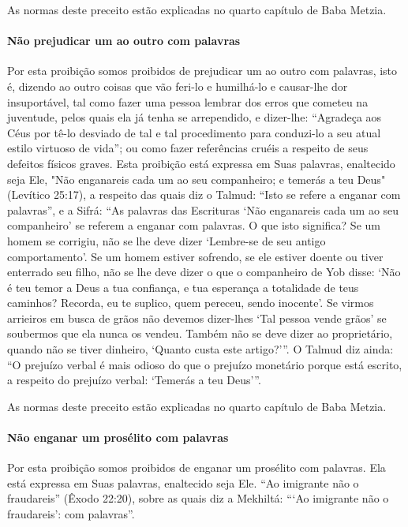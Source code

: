As normas deste preceito estão explicadas no quarto capítulo de Baba Metzia.

\paragraph{Não prejudicar um ao outro com palavras}

Por esta proibição somos proibidos de prejudicar um ao outro com
palavras, isto é, dizendo ao outro coisas que vão feri-lo e humilhá-lo e
causar-lhe dor insuportável, tal como fazer uma pessoa lembrar dos erros
que cometeu na juventude, pelos quais ela já tenha se arrependido, e
dizer-lhe: ``Agradeça aos Céus por tê-lo desviado de tal e tal
procedimento para conduzi-lo a seu atual estilo virtuoso de vida''; ou
como fazer referências cruéis a respeito de seus defeitos físicos
graves. Esta proibição está expressa em Suas palavras, enaltecido seja
Ele, "Não enganareis cada um ao seu companheiro; e temerás a teu Deus"
(Levítico 25:17), a respeito das quais diz o Talmud: ``Isto se refere a
enganar com palavras'', e a Sifrá: ``As palavras das Escrituras `Não
enganareis cada um ao seu companheiro' se referem a enganar com
palavras. O que isto significa? Se um homem se corrigiu, não se lhe
deve dizer `Lembre-se de seu antigo comportamento'. Se um homem estiver
sofrendo, se ele estiver doente ou tiver enterrado seu filho, não se
lhe deve dizer o que o companheiro de Yob disse: `Não é teu temor a Deus
a tua confiança, e tua esperança a totalidade de teus caminhos? Recorda,
eu te suplico, quem pereceu, sendo inocente'. Se virmos arrieiros em
busca de grãos não devemos dizer-lhes `Tal pessoa vende grãos' se
soubermos que ela nunca os vendeu. Também não se deve dizer ao
proprietário, quando não se tiver dinheiro, `Quanto custa este
artigo?'''. O Talmud diz ainda: ``O prejuízo verbal é mais odioso do que
o prejuízo monetário porque está escrito, a respeito do prejuízo
verbal: `Temerás a teu Deus'''.

As normas deste preceito estão explicadas no quarto capítulo de Baba Metzia.

\paragraph{Não enganar um prosélito com palavras}

Por esta proibição somos proibidos de enganar um prosélito com palavras.
Ela está expressa em Suas palavras, enaltecido seja Ele. ``Ao imigrante
não o fraudareis'' (Êxodo 22:20), sobre as quais diz a Mekhiltá: ```Ao
imigrante não o fraudareis': com palavras''.

